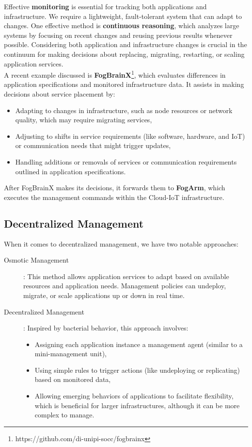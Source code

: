 Effective \textbf{monitoring} is essential for tracking both applications and infrastructure. We require a lightweight, fault-tolerant system that can adapt to changes. One effective method is \textbf{continuous reasoning}, which analyzes large systems by focusing on recent changes and reusing previous results whenever possible. Considering both application and infrastructure changes is crucial in the continuum for making decisions about replacing, migrating, restarting, or scaling application services. \\

A recent example discussed is \textbf{FogBrainX}\footnote{https://github.com/di-unipi-socc/fogbrainx}, which evaluates differences in application specifications and monitored infrastructure data. It assists in making decisions about service placement by:

\begin{itemize}
    \item Adapting to changes in infrastructure, such as node resources or network quality, which may require migrating services,
    \item Adjusting to shifts in service requirements (like software, hardware, and IoT) or communication needs that might trigger updates,
    \item Handling additions or removals of services or communication requirements outlined in application specifications.
\end{itemize}

After FogBrainX makes its decisions, it forwards them to \textbf{FogArm}, which executes the management commands within the Cloud-IoT infrastructure.

\subsection{Decentralized Management}

When it comes to decentralized management, we have two notable approaches:

\begin{description}
    \item[Osmotic Management]: This method allows application services to adapt based on available resources and application needs. Management policies can undeploy, migrate, or scale applications up or down in real time.
    
    \item[Decentralized Management]: Inspired by bacterial behavior, this approach involves:
    \begin{itemize}
        \item Assigning each application instance a management agent (similar to a mini-management unit),
        \item Using simple rules to trigger actions (like undeploying or replicating) based on monitored data,
        \item Allowing emerging behaviors of applications to facilitate flexibility, which is beneficial for larger infrastructures, although it can be more complex to manage.
    \end{itemize}
\end{description}

